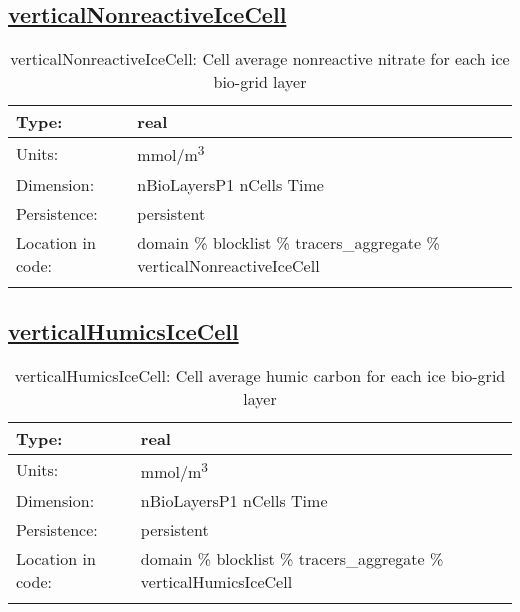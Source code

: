\subsection[verticalNonreactiveIceCell]{\hyperref[sec:var_tab_tracers_aggregate]{verticalNonreactiveIceCell}}
\label{subsec:var_sec_tracers_aggregate_verticalNonreactiveIceCell}
\begin{center}
\begin{longtable}{| p{2.0in} | p{4.0in} |}
        \hline 
        Type: & real \\
        \hline 
        Units: & \si{mmol/m^3} \\
        \hline 
        Dimension: & nBioLayersP1 nCells Time \\
        \hline 
        Persistence: & persistent \\
        \hline 
         Location in code: & domain \% blocklist \% tracers\_aggregate \% verticalNonreactiveIceCell \\
         \hline 
    \caption{verticalNonreactiveIceCell: Cell average nonreactive nitrate for each ice bio-grid layer}
\end{longtable}
\end{center}
\subsection[verticalHumicsIceCell]{\hyperref[sec:var_tab_tracers_aggregate]{verticalHumicsIceCell}}
\label{subsec:var_sec_tracers_aggregate_verticalHumicsIceCell}
\begin{center}
\begin{longtable}{| p{2.0in} | p{4.0in} |}
        \hline 
        Type: & real \\
        \hline 
        Units: & \si{mmol/m^3} \\
        \hline 
        Dimension: & nBioLayersP1 nCells Time \\
        \hline 
        Persistence: & persistent \\
        \hline 
         Location in code: & domain \% blocklist \% tracers\_aggregate \% verticalHumicsIceCell \\
         \hline 
    \caption{verticalHumicsIceCell: Cell average humic carbon for each ice bio-grid layer}
\end{longtable}
\end{center}
